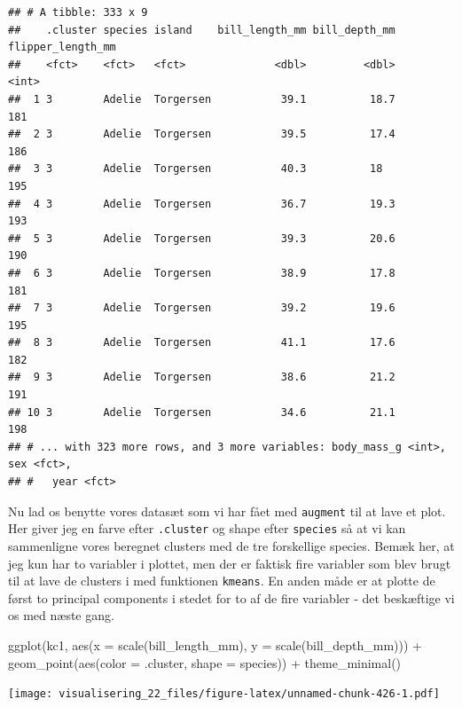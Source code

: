 \documentclass[
]{book}
\newenvironment{Shaded}{\begin{snugshade}}{\end{snugshade}}
\newcommand{\AttributeTok}[1]{\textcolor[rgb]{0.77,0.63,0.00}{#1}}
\newcommand{\FunctionTok}[1]{\textcolor[rgb]{0.00,0.00,0.00}{#1}}
\newcommand{\NormalTok}[1]{#1}
\newcommand{\SpecialCharTok}[1]{\textcolor[rgb]{0.00,0.00,0.00}{#1}}
\begin{document}
\begin{verbatim}
## # A tibble: 333 x 9
##    .cluster species island    bill_length_mm bill_depth_mm flipper_length_mm
##    <fct>    <fct>   <fct>              <dbl>         <dbl>             <int>
##  1 3        Adelie  Torgersen           39.1          18.7               181
##  2 3        Adelie  Torgersen           39.5          17.4               186
##  3 3        Adelie  Torgersen           40.3          18                 195
##  4 3        Adelie  Torgersen           36.7          19.3               193
##  5 3        Adelie  Torgersen           39.3          20.6               190
##  6 3        Adelie  Torgersen           38.9          17.8               181
##  7 3        Adelie  Torgersen           39.2          19.6               195
##  8 3        Adelie  Torgersen           41.1          17.6               182
##  9 3        Adelie  Torgersen           38.6          21.2               191
## 10 3        Adelie  Torgersen           34.6          21.1               198
## # ... with 323 more rows, and 3 more variables: body_mass_g <int>, sex <fct>,
## #   year <fct>
\end{verbatim}

Nu lad os benytte vores datasæt som vi har fået med \texttt{augment} til at lave et plot. Her giver jeg en farve efter \texttt{.cluster} og shape efter \texttt{species} så at vi kan sammenligne vores beregnet clusters med de tre forskellige species. Bemæk her, at jeg kun har to variabler i plottet, men der er faktisk fire variabler som blev brugt til at lave de clusters i med funktionen \texttt{kmeans}. En anden måde er at plotte de først to principal components i stedet for to af de fire variabler - det beskæftige vi os med næste gang.

\begin{Shaded}
\begin{Highlighting}[]
\FunctionTok{ggplot}\NormalTok{(kc1, }\FunctionTok{aes}\NormalTok{(}\AttributeTok{x =} \FunctionTok{scale}\NormalTok{(bill\_length\_mm), }
                \AttributeTok{y =} \FunctionTok{scale}\NormalTok{(bill\_depth\_mm))) }\SpecialCharTok{+} 
  \FunctionTok{geom\_point}\NormalTok{(}\FunctionTok{aes}\NormalTok{(}\AttributeTok{color =}\NormalTok{ .cluster, }\AttributeTok{shape =}\NormalTok{ species)) }\SpecialCharTok{+} \FunctionTok{theme\_minimal}\NormalTok{()}
\end{Highlighting}
\end{Shaded}

\texttt{[image: visualisering\_22\_files/figure-latex/unnamed-chunk-426-1.pdf]}
\end{document}
